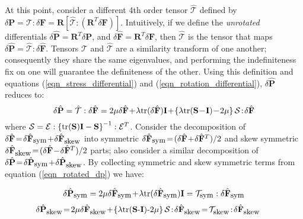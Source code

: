 At this point, consider a different 4th order tensor $\hat{\mathcal{T}}$ defined by
$\delta\mathbf{P}=\mathcal{T}:\delta\mathbf{F}=\mathbf{R}[\hat{\mathcal{T}}:(\mathbf{R}^T\delta\mathbf{F})]$. Intuitively, if we define the \emph{unrotated} differentials
$\delta\hat{\mathbf{P}}=\mathbf{R}^T\delta\mathbf{P}$, and $\delta\hat{\mathbf{F}}=\mathbf{R}^T\delta\mathbf{F}$, then $\hat{\mathcal{T}}$ is the tensor that maps
$\delta\hat{\mathbf{P}}=\hat{\mathcal{T}}:\delta\hat{\mathbf{F}}$. Tensors $\mathcal{T}$ and $\hat{\mathcal{T}}$ are a similarity transform of one another; consequently they share the
same eigenvalues, and performing the indefiniteness fix on one will guarantee the definiteness of the other. Using this definition and equations (\ref{eqn_stress_differential}) and
(\ref{eqn_rotation_differential}), $\delta\hat{\mathbf{P}}$ reduces to:
\begin{equation}
\delta\hat{\mathbf{P}}=\hat{\mathcal{T}}:\delta\hat{\mathbf{F}}=
2\mu\delta\hat{\mathbf{F}}\!+\!\lambda\tr(\delta\hat{\mathbf{F}})\mathbf{I}\!+\!\left\{\lambda\tr(\mathbf{S}\!-\!\mathbf{I})\!-\!2\mu\right\}\mathcal{S}\!:\!\delta\hat{\mathbf{F}}
\label{eqn_rotated_dp}
\end{equation}
where $\mathcal{S}=\mathcal{E}:\left\{\mbox{tr}(\mathbf{S})\mathbf{I}-\mathbf{S}\right\}^{-1}:\mathcal{E}^T$. Consider the decomposition of
$\delta\hat{\mathbf{F}}\!=\!\delta\hat{\mathbf{F}}_{\mbox{\small sym}}\!+\!\delta\hat{\mathbf{F}}_{\mbox{\small skew}}$ into symmetric 
$\delta\hat{\mathbf{F}}_{\mbox{\small sym}}\!=\!(\delta\hat{\mathbf{F}}\!+\!\delta\hat{\mathbf{F}}^T)/2$ and skew symmetric
$\delta\hat{\mathbf{F}}_{\mbox{\small skew}}\!=\!(\delta\hat{\mathbf{F}}\!-\!\delta\hat{\mathbf{F}}^T)/2$ parts; also consider a similar decomposition of 
$\delta\hat{\mathbf{P}}\!=\!\delta\hat{\mathbf{P}}_{\mbox{\small sym}}\!+\!\delta\hat{\mathbf{P}}_{\mbox{\small skew}}$. By collecting symmetric and skew symmetric terms from equation
(\ref{eqn_rotated_dp}) we have:

\begin{equation}
\delta\hat{\mathbf{P}}_{\mbox{\small sym}}=2\mu\delta\hat{\mathbf{F}}_{\mbox{\small sym}}\!+\!\lambda\mbox{tr}(\delta\hat{\mathbf{F}}_{\mbox{\small sym}})\mathbf{I}=\mathcal{T}_{\mbox{\small sym}}:\delta\hat{\mathbf{F}}_{\mbox{\small sym}}
\label{eqn_dp_sym}
\end{equation}
\begin{equation}
\hspace*{-.2in}\delta\hat{\mathbf{P}}_{\mbox{\small skew}}
\!=\!2\mu\delta\hat{\mathbf{F}}_{\mbox{\small skew}}\!+\!\left\{\lambda\tr(\mathbf{S}\mbox{-}\mathbf{I})\mbox{-}2\mu\right\}\mathcal{S}\!:\!\delta\hat{\mathbf{F}}_{\mbox{\small skew}}
\!=\!\mathcal{T}_{\mbox{\small skew}}\!:\!\delta\hat{\mathbf{F}}_{\mbox{\small skew}}
\label{eqn_dp_skew}
\end{equation}

